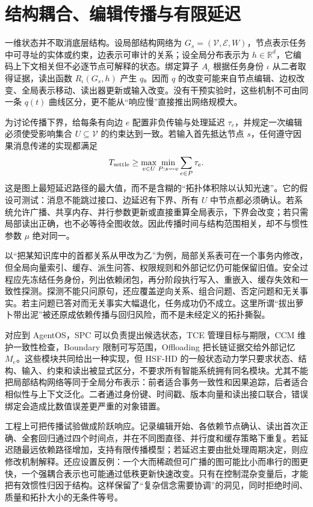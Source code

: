 \section{结构耦合、编辑传播与有限延迟}
\label{sec:cognitive_equivalence_principle}

一维状态并不取消底层结构。设局部结构网络为 $G_s=(\mathcal V,\mathcal E,W)$，节点表示任务中可寻址的实体或约束，边表示可审计的关系；设全局分布表示为 $h\in\mathbb R^d$，它编码上下文相关但不必逐节点可解释的状态。绑定算子 $A_\iota$ 根据任务身份 $\iota$ 从二者取得证据，读出函数 $R_\iota(G_s,h)$ 产生 $q$。因而 $q$ 的改变可能来自节点编辑、边权改变、全局表示移动、读出器更新或输入改变。没有干预实验时，这些机制不可由同一条 $q(t)$ 曲线区分，更不能从“响应慢”直接推出网络规模大。

为讨论传播下界，给每条有向边 $e$ 配置非负传输与处理延迟 $\tau_e$，并规定一次编辑必须使受影响集合 $U\subseteq\mathcal V$ 的约束达到一致。若输入首先抵达节点 $s$，任何遵守因果消息传递的实现都满足
\[
T_{\rm settle}\ge \max_{v\in U}\min_{P:s\leadsto v}\sum_{e\in P}\tau_e .
\]
这是图上最短延迟路径的最大值，而不是含糊的“拓扑体积除以认知光速”。它的假设可测试：消息不能跳过接口、边延迟有下界、所有 $U$ 中节点都必须确认。若系统允许广播、共享内存、并行参数更新或直接重算全局表示，下界会改变；若只需局部读出正确，也不必等待全图收敛。因此传播时间与结构范围相关，却不与惯性参数 $\mu$ 绝对同一。

以“把某知识库中的首都关系从甲改为乙”为例，局部关系表可在一个事务内修改，但全局向量索引、缓存、派生问答、权限规则和外部记忆仍可能保留旧值。安全过程应先冻结任务身份，列出依赖闭包，再分阶段执行写入、重嵌入、缓存失效和一致性探测。探测不能只问原句，还应覆盖逆向关系、组合问题、否定问题和无关事实。若主问题已答对而无关事实大幅退化，任务成功仍不成立。这里所谓“拔出萝卜带出泥”被还原成依赖传播与回归风险，而不是未经定义的拓扑撕裂。

对应到 AgentOS，SPC 可以负责提出候选状态，TCE 管理目标与期限，CCM 维护一致性检查，Boundary 限制可写范围，Offloading 把长链证据交给外部记忆 $M_e$。这些模块共同给出一种实现，但 HSF-HD 的一般状态动力学只要求状态、结构、输入、约束和读出被显式区分，不要求所有智能系统拥有同名模块。尤其不能把局部结构网络等同于全局分布表示：前者适合事务一致性和因果追踪，后者适合相似性与上下文泛化。二者通过身份键、时间戳、版本向量和读出接口联合，错误绑定会造成比数值误差更严重的对象错置。

工程上可把传播试验做成阶跃响应。记录编辑开始、各依赖节点确认、读出首次正确、全套回归通过四个时间点，并在不同图直径、并行度和缓存策略下重复。若延迟随最远依赖路径增加，支持有限传播模型；若延迟主要由批处理周期决定，则应修改机制解释。还应设置反例：一个大而稀疏但可广播的图可能比小而串行的图更快，一个强耦合表示也可能通过低秩更新快速改变。只有在控制混杂变量后，才能把有效惯性归因于结构。这样保留了“复杂信念需要协调”的洞见，同时拒绝时间、质量和拓扑大小的无条件等号。

